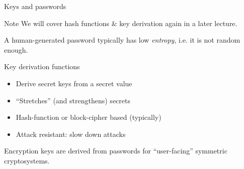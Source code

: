 \begin{frame}{Keys and passwords}
  \begin{block}{Note}
    We will cover hash functions \& key derivation again in a later lecture.
  \end{block}

  \pause
  A human-generated password typically has low \emph{entropy}, i.e. it is not random enough.

  \pause
  Key derivation functions
  \begin{itemize}
    \item Derive secret keys from a secret value
    \item \enquote{Stretches} (and strengthens) secrets
    \item Hash-function or block-cipher based (typically)
    \item Attack resistant: slow down attacks
  \end{itemize}

  \pause
  Encryption keys are derived from passwords for \enquote{user-facing} symmetric cryptosystems.
\end{frame}


